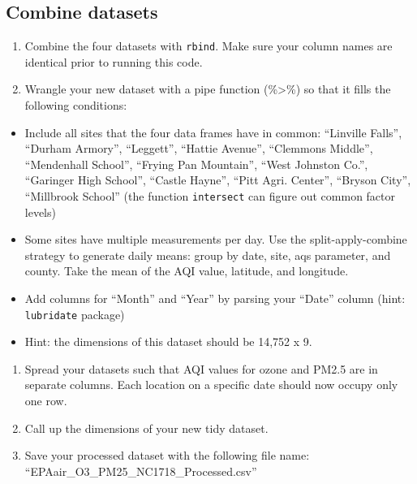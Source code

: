 \documentclass[]{article}
\providecommand{\tightlist}{%
  \setlength{\itemsep}{0pt}\setlength{\parskip}{0pt}}
\begin{document}
\hypertarget{combine-datasets}{%
\subsection{Combine datasets}\label{combine-datasets}}

\begin{enumerate}
\def\labelenumi{\arabic{enumi}.}
\setcounter{enumi}{6}
\tightlist
\item
  Combine the four datasets with \texttt{rbind}. Make sure your column
  names are identical prior to running this code.
\item
  Wrangle your new dataset with a pipe function (\%\textgreater\%) so
  that it fills the following conditions:
\end{enumerate}

\begin{itemize}
\tightlist
\item
  Include all sites that the four data frames have in common: ``Linville
  Falls'', ``Durham Armory'', ``Leggett'', ``Hattie Avenue'', ``Clemmons
  Middle'', ``Mendenhall School'', ``Frying Pan Mountain'', ``West
  Johnston Co.'', ``Garinger High School'', ``Castle Hayne'', ``Pitt
  Agri. Center'', ``Bryson City'', ``Millbrook School'' (the function
  \texttt{intersect} can figure out common factor levels)
\item
  Some sites have multiple measurements per day. Use the
  split-apply-combine strategy to generate daily means: group by date,
  site, aqs parameter, and county. Take the mean of the AQI value,
  latitude, and longitude.
\item
  Add columns for ``Month'' and ``Year'' by parsing your ``Date'' column
  (hint: \texttt{lubridate} package)
\item
  Hint: the dimensions of this dataset should be 14,752 x 9.
\end{itemize}

\begin{enumerate}
\def\labelenumi{\arabic{enumi}.}
\setcounter{enumi}{8}
\tightlist
\item
  Spread your datasets such that AQI values for ozone and PM2.5 are in
  separate columns. Each location on a specific date should now occupy
  only one row.
\item
  Call up the dimensions of your new tidy dataset.
\item
  Save your processed dataset with the following file name:
  ``EPAair\_O3\_PM25\_NC1718\_Processed.csv''
\end{enumerate}
\end{document}
